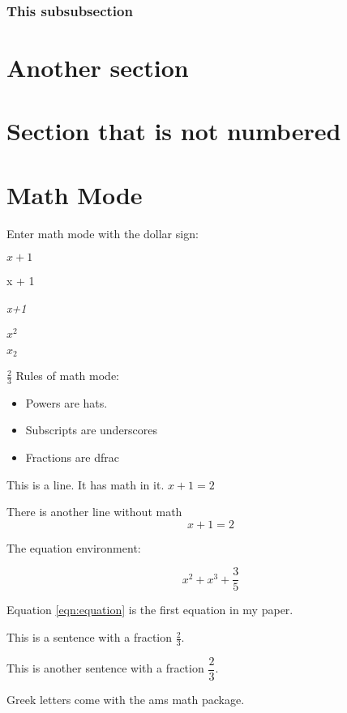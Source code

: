 \documentclass[12pt]{article} %
\begin{document}
\lipsum 

\subsubsection{This subsubsection}

\lipsum 

\section{Another section}

\lipsum[2]

\section*{Section that is not numbered}

\section{Math Mode}

Enter math mode with the dollar sign:

$x + 1$

x + 1

\textit{x+1}

$x^2$

$x_2$

$\frac{2}{3}$
Rules of math mode:

\begin{itemize}
    \item Powers are hats.
    \item Subscripts are underscores
    \item Fractions are dfrac
\end{itemize}

This is a line. It has math in it. $x + 1 = 2$

There is another line without math $$x + 1 = 2$$

The equation environment:

\begin{equation}
    x^2 + x^3 + \frac{3}{5}
    \label{eqn:equation}
\end{equation}

Equation \ref{eqn:equation} is the first equation in my paper. 

This is a sentence with a fraction $\frac{2}{3}$. 

This is another sentence with a fraction $\dfrac{2}{3}$. 

Greek letters come with the ams math package. 
\end{document}
